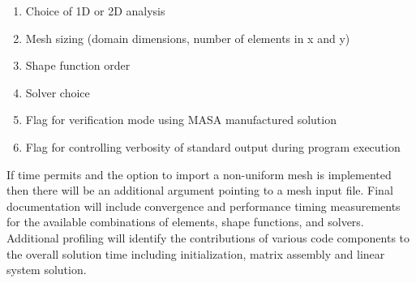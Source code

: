 \documentclass[11pt, oneside]{article}   	%
\begin{document}
\begin{enumerate}

\item Choice of 1D or 2D analysis
\item Mesh sizing (domain dimensions, number of elements in x and y)
\item Shape function order
\item Solver choice
\item Flag for verification mode using MASA manufactured solution
\item Flag for controlling verbosity of standard output during program execution

\end{enumerate}

If time permits and the option to import a non-uniform mesh is implemented then there will be an additional argument pointing to a mesh input file.  Final documentation will include convergence and performance timing measurements for the available combinations of elements, shape functions, and solvers.  Additional profiling will identify the contributions of various code components to the overall solution time including initialization, matrix assembly and linear system solution.
\end{document}
